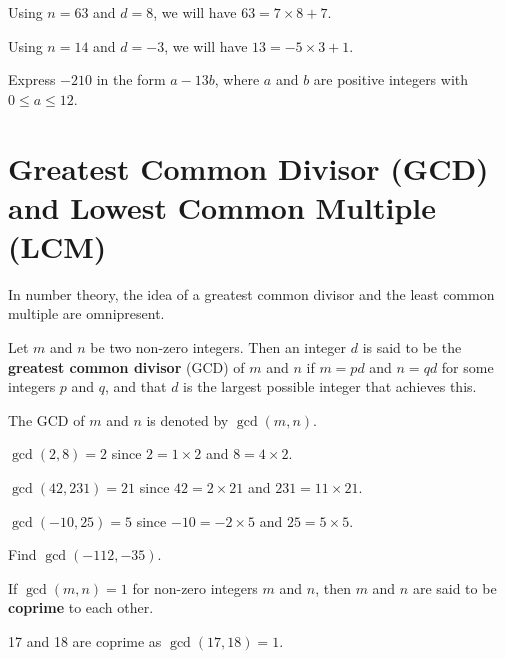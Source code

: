 \begin{example}
    Using $n = 63$ and $d = 8$, we will have $63 = 7\times8 + 7$.
\end{example}
\begin{example}
    Using $n = 14$ and $d = -3$, we will have $13 = -5\times3 + 1$.
\end{example}

\begin{exercise}
    Express $-210$ in the form $a-13b$, where $a$ and $b$ are positive integers with $0 \leq a \leq 12$.
\end{exercise}

\section{Greatest Common Divisor (GCD) and Lowest Common Multiple (LCM)}
In number theory, the idea of a greatest common divisor and the least common multiple are omnipresent.

\begin{definition}
    Let $m$ and $n$ be two non-zero integers. Then an integer $d$ is said to be the \textbf{greatest common divisor} (GCD) of $m$ and $n$ if $m = pd$ and $n = qd$ for some integers $p$ and $q$, and that $d$ is the largest possible integer that achieves this.
\end{definition}
The GCD of $m$ and $n$ is denoted by $\gcd(m, n)$.

\begin{example}
    $\gcd(2, 8) = 2$ since $2 = 1 \times 2$ and $8 = 4 \times 2$.
\end{example}
\begin{example}
    $\gcd(42, 231) = 21$ since $42 = 2 \times 21$ and $231 = 11 \times 21$.
\end{example}
\begin{example}
    $\gcd(-10, 25) = 5$ since $-10 = -2 \times 5$ and $25 = 5 \times 5$.
\end{example}
\begin{exercise}
    Find $\gcd(-112, -35)$.
\end{exercise}

\begin{remark}
    If $\gcd(m, n) = 1$ for non-zero integers $m$ and $n$, then $m$ and $n$ are said to be \textbf{coprime} to each other.
\end{remark}
\begin{example}
    17 and 18 are coprime as $\gcd(17, 18) = 1$.
\end{example}

